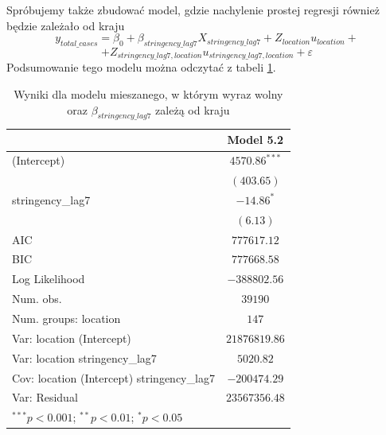 \documentclass[12pt]{mwbk}
\theoremstyle{plain}
\theoremstyle{definition}
\theoremstyle{definition}
\begin{document}
\noindent Spróbujemy także zbudować model, gdzie nachylenie prostej regresji również będzie zależało od kraju
$$y_{total\_cases}=\beta_0+\beta_{stringency\_lag7} X_{stringency\_lag7}+Z_{location}u_{location}+$$$$+Z_{stringency\_lag7,location}u_{stringency\_lag7,location}+\varepsilon$$
Podsumowanie tego modelu można odczytać z tabeli \ref{table:mod5-slope}.
\newpage
\begin{table}[!htpb]
	\begin{center}
		\begin{tabular}{l c}
			\hline
			& Model 5.2 \\
			\hline
			(Intercept)                                & $4570.86^{***}$ \\
			& $(403.65)$      \\
			stringency\_lag7                           & $-14.86^{*}$    \\
			& $(6.13)$        \\
			\hline
			AIC                                        & $777617.12$     \\
			BIC                                        & $777668.58$     \\
			Log Likelihood                             & $-388802.56$    \\
			Num. obs.                                  & $39190$         \\
			Num. groups: location                      & $147$           \\
			Var: location (Intercept)                  & $21876819.86$   \\
			Var: location stringency\_lag7             & $5020.82$       \\
			Cov: location (Intercept) stringency\_lag7 & $-200474.29$    \\
			Var: Residual                              & $23567356.48$   \\
			\hline
			\multicolumn{2}{l}{\scriptsize{$^{***}p<0.001$; $^{**}p<0.01$; $^{*}p<0.05$}}
		\end{tabular}
		\caption{Wyniki dla modelu mieszanego, w którym wyraz wolny oraz $\beta_{stringency\_lag7}$ zależą od kraju}
		\label{table:mod5-slope}
	\end{center}
\end{table}
\end{document}
